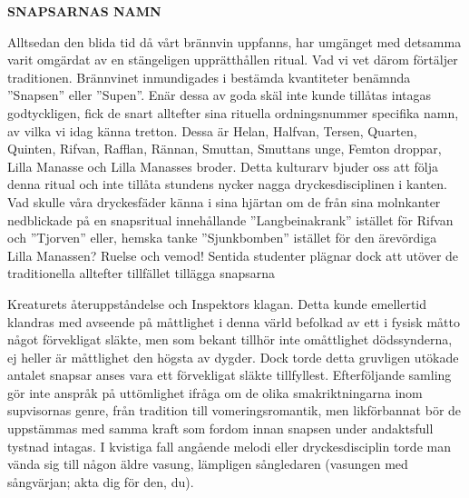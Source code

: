 \begin{intersong}

\textbf{SNAPSARNAS NAMN}

\begin{small}
Alltsedan den blida tid då vårt brännvin uppfanns, har umgänget med detsamma varit omgärdat av en stängeligen upprätthållen ritual. Vad vi vet därom förtäljer traditionen. Brännvinet inmundigades i bestämda kvantiteter benämnda ''Snapsen'' eller ''Supen''. Enär dessa av goda skäl inte kunde tillåtas intagas godtyckligen, fick de snart alltefter sina rituella ordningsnummer specifika namn, av vilka vi idag känna tretton. Dessa är Helan, Halfvan, Tersen, Quarten, Quinten, Rifvan, Rafflan, Rännan, Smuttan, Smuttans unge, Femton droppar, Lilla Manasse och Lilla Manasses broder. Detta kulturarv bjuder oss att följa denna ritual och inte tillåta stundens nycker nagga dryckesdisciplinen i kanten. Vad skulle våra dryckesfäder känna i sina hjärtan om de från sina molnkanter nedblickade på en snapsritual innehållande ''Langbeinakrank'' istället för Rifvan och ''Tjorven'' eller, hemska tanke ''Sjunkbomben'' istället för den ärevördiga Lilla Manassen? Ruelse och vemod! Sentida studenter plägnar dock att utöver de traditionella alltefter tillfället tillägga snapsarna 
\end{small}
\end{intersong}

\begin{intersong}
\begin{small}
Kreaturets återuppståndelse och Inspektors klagan. Detta kunde emellertid klandras med avseende på måttlighet i denna värld befolkad av ett i fysisk måtto något förvekligat släkte, men som bekant tillhör inte omåttlighet dödssynderna, ej heller är måttlighet den högsta av dygder. Dock torde detta gruvligen utökade antalet snapsar anses vara ett förvekligat släkte tillfyllest. Efterföljande samling gör inte anspråk på uttömlighet ifråga om de olika smakriktningarna inom supvisornas genre, från tradition till vomeringsromantik, men likförbannat bör de uppstämmas med samma kraft som fordom innan snapsen under andaktsfull tystnad intagas. I kvistiga fall angående melodi eller dryckesdisciplin torde man vända sig till någon äldre vasung, lämpligen sångledaren (vasungen med sångvärjan; akta dig för den, du).
\end{small}
\end{intersong}